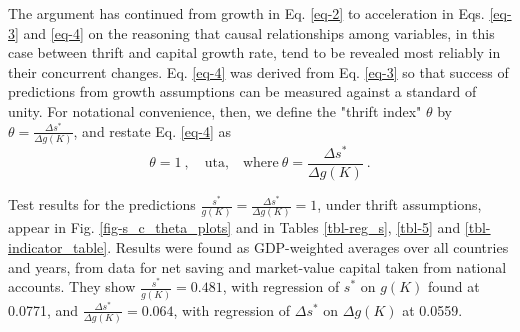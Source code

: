\documentclass[a4paper,fleqn]{latex_styles/cas-sc}
\begin{document}
The argument has continued from growth in Eq. \eqref{eq-2} to acceleration in Eqs. \eqref{eq-3} and \eqref{eq-4} on the reasoning that causal relationships among variables, in this case between thrift and capital growth rate, tend to be revealed most reliably in their concurrent changes. Eq. \eqref{eq-4} was derived from Eq. \eqref{eq-3} so that success of predictions from growth assumptions can be measured against a standard of unity. For notational convenience, then, we define the "thrift index" \(\theta\) by \(\theta = \frac{\Delta s^*}{\Delta g(K)}\), and restate Eq. \eqref{eq-4} as
%
\begin{equation}
\theta = 1\ , \quad \text{uta,}\quad \text{where} \ \theta = \frac{\Delta s^*}{\Delta g(K)}\ . \label{eq-5}
\end{equation}
%

Test results for the predictions \(\frac{s^*}{g(K)} = \frac{\Delta s^*}{\Delta g(K)} = 1\), under thrift assumptions, appear in Fig. \ref{fig-s_c_theta_plots} and in Tables \ref{tbl-reg_s}, \ref{tbl-5} and \ref{tbl-indicator_table}. Results were found as GDP-weighted averages over all countries and years, from data for net saving and market-value capital taken from national accounts. They show \(\frac{s^*}{g(K)} = 0.481\), with regression of \(s^*\) on \(g(K)\) found at 0.0771, and \(\frac{\Delta s^*}{\Delta g(K)} = 0.064\), with regression of \(\Delta s^*\) on \(\Delta g(K)\) at 0.0559.
\end{document}
